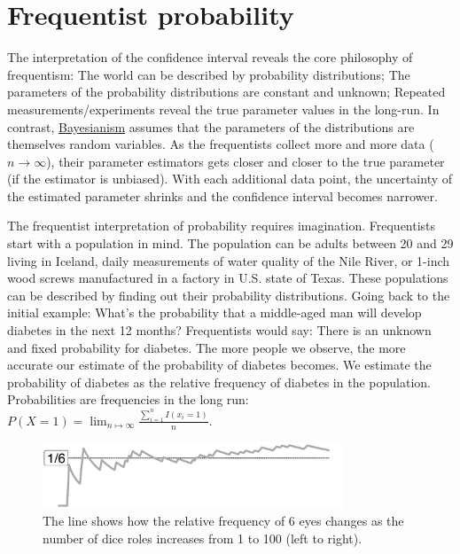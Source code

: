 \documentclass[
  10pt,
]{scrbook}
\begin{document}
\hypertarget{frequentist-probability}{%
\section{Frequentist probability}\label{frequentist-probability}}

The interpretation of the confidence interval reveals the core philosophy of frequentism:
The world can be described by probability distributions;
The parameters of the probability distributions are constant and unknown;
Repeated measurements/experiments reveal the true parameter values in the long-run.
In contrast, \protect\hyperlink{bayesian}{Bayesianism} assumes that the parameters of the distributions are themselves random variables.
As the frequentists collect more and more data (\(n \to \infty\)), their parameter estimators gets closer and closer to the true parameter (if the estimator is unbiased).
With each additional data point, the uncertainty of the estimated parameter shrinks and the confidence interval becomes narrower.

The frequentist interpretation of probability requires imagination.
Frequentists start with a population in mind.
The population can be adults between 20 and 29 living in Iceland, daily measurements of water quality of the Nile River, or 1-inch wood screws manufactured in a factory in U.S. state of Texas.
These populations can be described by finding out their probability distributions.
Going back to the initial example:
What's the probability that a middle-aged man will develop diabetes in the next 12 months?
Frequentists would say: There is an unknown and fixed probability for diabetes.
The more people we observe, the more accurate our estimate of the probability of diabetes becomes.
We estimate the probability of diabetes as the relative frequency of diabetes in the population.
Probabilities are frequencies in the long run: \(P(X=1) = \lim_{n \mapsto \infty} \frac{\sum_{i=1}^{n} I(x_i = 1)}{n}\).

\begin{figure}

{\centering \includegraphics[width=0.8\textwidth]{figures/dice-1} 

}

\caption{The line shows how the relative frequency of 6 eyes changes as the number of dice roles increases from 1 to 100 (left to right).}\label{fig:dice}
\end{figure}
\end{document}
